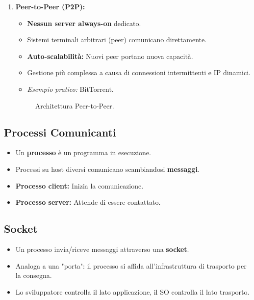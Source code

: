 \documentclass{article}
\begin{document}
\begin{enumerate}
    \item \textbf{Peer-to-Peer (P2P):}
    \begin{itemize}
        \item \textbf{Nessun server always-on} dedicato.
        \item Sistemi terminali arbitrari (peer) comunicano direttamente.
        \item \textbf{Auto-scalabilità:} Nuovi peer portano nuova capacità.
        \item Gestione più complessa a causa di connessioni intermittenti e IP dinamici.
        \item \textit{Esempio pratico:} BitTorrent.
    \end{itemize}
\begin{figure}[H]
    \centering
    \caption{Architettura Peer-to-Peer.}
\end{figure}
\end{enumerate}


\subsection{Processi Comunicanti}
\begin{itemize}
    \item Un \textbf{processo} è un programma in esecuzione.
    \item Processi su host diversi comunicano scambiandosi \textbf{messaggi}.
    \item \textbf{Processo client:} Inizia la comunicazione.
    \item \textbf{Processo server:} Attende di essere contattato.
\end{itemize}

\subsection{Socket}
\begin{itemize}
    \item Un processo invia/riceve messaggi attraverso una \textbf{socket}.
    \item Analoga a una "porta": il processo si affida all'infrastruttura di trasporto per la consegna.
    \item Lo sviluppatore controlla il lato applicazione, il SO controlla il lato trasporto.
\end{itemize}
\end{document}

